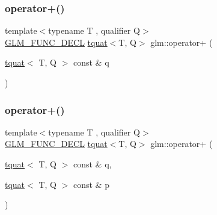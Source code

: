 \subsubsection{\texorpdfstring{operator+()}{operator+()}\hspace{0.1cm}{\footnotesize\ttfamily [1/2]}}
{\footnotesize\ttfamily template$<$typename T , qualifier Q$>$ \\
\mbox{\hyperlink{setup_8hpp_ab2d052de21a70539923e9bcbf6e83a51}{G\+L\+M\+\_\+\+F\+U\+N\+C\+\_\+\+D\+E\+CL}} \mbox{\hyperlink{structglm_1_1tquat}{tquat}}$<$T, Q$>$ glm\+::operator+ (\begin{DoxyParamCaption}\item[{\mbox{\hyperlink{structglm_1_1tquat}{tquat}}$<$ T, Q $>$ const \&}]{q }\end{DoxyParamCaption})}

\mbox{\label{group__gtc__quaternion_ga90911b1428a0a773fa9e0c0952ce25fd}} 
\subsubsection{\texorpdfstring{operator+()}{operator+()}\hspace{0.1cm}{\footnotesize\ttfamily [2/2]}}
{\footnotesize\ttfamily template$<$typename T , qualifier Q$>$ \\
\mbox{\hyperlink{setup_8hpp_ab2d052de21a70539923e9bcbf6e83a51}{G\+L\+M\+\_\+\+F\+U\+N\+C\+\_\+\+D\+E\+CL}} \mbox{\hyperlink{structglm_1_1tquat}{tquat}}$<$T, Q$>$ glm\+::operator+ (\begin{DoxyParamCaption}\item[{\mbox{\hyperlink{structglm_1_1tquat}{tquat}}$<$ T, Q $>$ const \&}]{q,  }\item[{\mbox{\hyperlink{structglm_1_1tquat}{tquat}}$<$ T, Q $>$ const \&}]{p }\end{DoxyParamCaption})}

\mbox{\label{group__gtc__quaternion_ga594339bbf8d9d11ec27ada0502d4eeaf}} 
